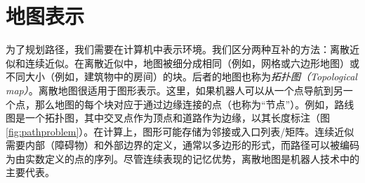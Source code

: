 \section{地图表示}
\label{sec:maps}


为了规划路径，我们需要在计算机中表示环境。我们区分两种互补的方法：离散近似和连续近似。在离散近似中，地图被细分成相同（例如，网格或六边形地图）或不同大小（例如，建筑物中的房间）的块。后者的地图也称为\emph{拓扑图（Topological map）}。离散地图很适用于图形表示。这里，如果机器人可以从一个点导航到另一个点，那么地图的每个块对应于通过边缘连接的点（也称为“节点”）。例如，路线图是一个拓扑图，其中交叉点作为顶点和道路作为边缘，以其长度标注（图\ref{fig:pathproblem}）。在计算上，图形可能存储为邻接或入口列表/矩阵。连续近似需要内部（障碍物）和外部边界的定义，通常以多边形的形式，而路径可以被编码为由实数定义的点的序列。尽管连续表现的记忆优势，离散地图是机器人技术中的主要代表。

